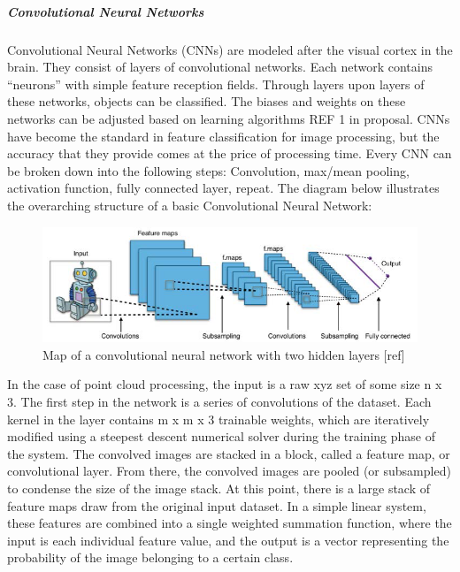 \documentclass[12pt]{drexelthesis}
\begin{document}
\subparagraph{Convolutional Neural Networks}
Convolutional Neural Networks (CNNs) are modeled after the visual cortex in the brain. They consist of layers of convolutional networks. Each network contains “neurons” with simple feature reception fields. Through layers upon layers of these networks, objects can be classified. The biases and weights on these networks can be adjusted based on learning algorithms REF 1 in proposal. CNNs have become the standard in feature classification for image processing, but the accuracy that they provide comes at the price of processing time. 
Every CNN can be broken down into the following steps: Convolution, max/mean pooling, activation function, fully connected layer, repeat. The diagram below illustrates the overarching structure of a basic Convolutional Neural Network:
\begin{figure}[!ht]
	\centering
		\includegraphics[width=6in]{cnn.png}
	\caption[High level flow chart of a convolutional neural network]{\centering Map of a convolutional neural network with two hidden layers [ref]}
\end{figure}

In the case of point cloud processing, the input is a raw xyz set of some size n x 3. The first step in the network is a series of convolutions of the dataset. Each kernel in the layer contains m x m x 3 trainable weights, which are iteratively modified using a steepest descent numerical solver during the training phase of the system. The convolved images are stacked in a block, called a feature map, or convolutional layer. From there, the convolved images are pooled (or subsampled) to condense the size of the image stack. 
At this point, there is a large stack of feature maps draw from the original input dataset. In a simple linear system, these features are combined into a single weighted summation function, where the input is each individual feature value, and the output is a vector representing the probability of the image belonging to a certain class.
\end{document}
